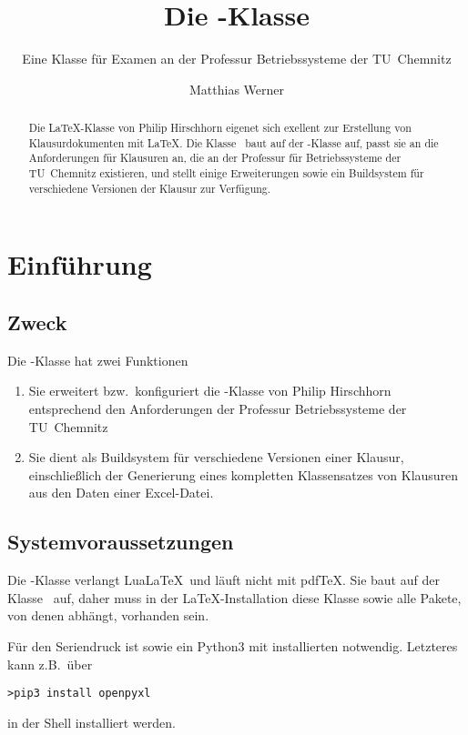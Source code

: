 \documentclass[
load=osgexam,
babel=ngerman
]{skdoc}
\author{Matthias Werner}
\title{Die \thepkg-Klasse}
\subtitle{Eine Klasse für Examen an der Professur Betriebssysteme der TU~Chemnitz}
\begin{document}
\maketitle
\begin{abstract}
    Die \LaTeX-Klasse  von \textsf{Philip Hirschhorn} eigenet sich exellent zur Erstellung von
    Klausurdokumenten mit \LaTeX. Die Klasse \thepkg\  baut auf der -Klasse auf, passt sie an die
    Anforderungen für Klausuren an, die an der Professur für Betriebssysteme der
    TU~Chemnitz existieren, und stellt einige Erweiterungen sowie ein
    Buildsystem für verschiedene Versionen der Klausur zur Verfügung. 
\end{abstract}

\tableofcontents\clearpage


\section{Einführung}
\subsection{Zweck}
Die -Klasse hat zwei Funktionen
\begin{enumerate}
  \item Sie erweitert bzw.\ konfiguriert die -Klasse von \textsf{Philip Hirschhorn} entsprechend den
    Anforderungen der Professur Betriebssysteme der TU~Chemnitz
  \item Sie dient als Buildsystem für verschiedene Versionen einer Klausur, einschließlich der Generierung eines
    kompletten Klassensatzes von Klausuren aus den Daten einer Excel-Datei.
\end{enumerate}
\subsection{Systemvoraussetzungen}
Die \thepkg-Klasse verlangt Lua\LaTeX\ und läuft nicht mit pdfTeX. Sie baut auf der Klasse \ auf, daher muss
in der \LaTeX-Installation diese Klasse sowie alle Pakete, von denen 
abhängt, vorhanden sein.
 
Für den Seriendruck ist  sowie ein Python3 mit installierten
 notwendig. Letzteres kann z.\;B.\ über

\begin{verbatim}
>pip3 install openpyxl
\end{verbatim}
in der Shell installiert werden.
\end{document}
